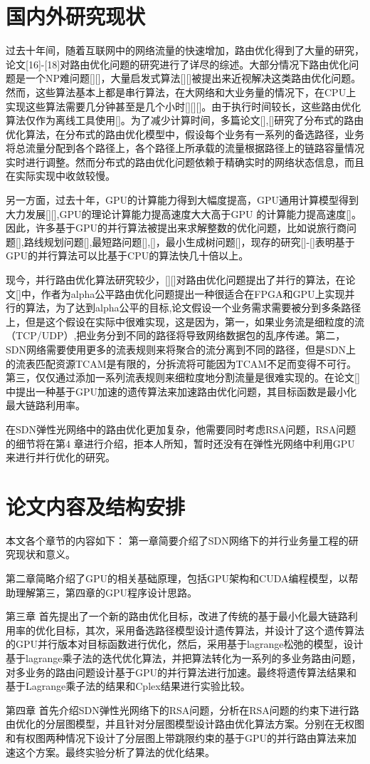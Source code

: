 \documentclass[master]{thesis-uestc}
\begin{document}
\section{国内外研究现状}
过去十年间，随着互联网中的网络流量的快速增加，路由优化得到了大量的研究，论文[16]-[18]对路由优化问题的研究进行了详尽的综述。大部分情况下路由优化问题是一个NP难问题[][]，大量启发式算法[][]被提出来近视解决这类路由优化问题。然而，这些算法基本上都是串行算法，在大网络和大业务量的情况下，在CPU上实现这些算法需要几分钟甚至是几个小时[][][]。由于执行时间较长，这些路由优化算法仅作为离线工具使用[]。为了减少计算时间，多篇论文[],[]研究了分布式的路由优化算法，在分布式的路由优化模型中，假设每个业务有一系列的备选路径，业务将总流量分配到各个路径上，各个路径上所承载的流量根据路径上的链路容量情况实时进行调整。然而分布式的路由优化问题依赖于精确实时的网络状态信息，而且在实际实现中收敛较慢。

另一方面，过去十年，GPU的计算能力得到大幅度提高，GPU通用计算模型得到大力发展[][],GPU的理论计算能力提高速度大大高于GPU 的计算能力提高速度[]。因此，许多基于GPU的并行算法被提出来求解整数的优化问题，比如说旅行商问题[],路线规划问题[],最短路问题[],[]，最小生成树问题[]，现存的研究[]-[]表明基于GPU的并行算法可以比基于CPU的算法快几十倍以上。

 现今，并行路由优化算法研究较少，[][]对路由优化问题提出了并行的算法，在论文[]中，作者为alpha公平路由优化问题提出一种很适合在FPGA和GPU上实现并行的算法，为了达到alpha公平的目标,论文假设一个业务需求需要被分到多条路径上，但是这个假设在实际中很难实现，这是因为，第一，如果业务流是细粒度的流（TCP/UDP）,把业务分到不同的路径将导致网络数据包的乱序传递。第二，SDN网络需要使用更多的流表规则来将聚合的流分离到不同的路径，但是SDN上的流表匹配资源TCAM是有限的，分拆流将可能因为TCAM不足而变得不可行。第三，仅仅通过添加一系列流表规则来细粒度地分割流量是很难实现的。在论文[]中提出一种基于GPU加速的遗传算法来加速路由优化问题，其目标函数是最小化最大链路利用率。

 在SDN弹性光网络中的路由优化更加复杂，他需要同时考虑RSA问题，RSA问题的细节将在第4 章进行介绍，拒本人所知，暂时还没有在弹性光网络中利用GPU来进行并行优化的研究。
\section{论文内容及结构安排}
本文各个章节的内容如下：
    第一章简要介绍了SDN网络下的并行业务量工程的研究现状和意义。

    第二章简略介绍了GPU的相关基础原理，包括GPU架构和CUDA编程模型，以帮助理解第三，第四章的GPU程序设计思路。

    第三章 首先提出了一个新的路由优化目标，改进了传统的基于最小化最大链路利用率的优化目标，其次，采用备选路径模型设计遗传算法，并设计了这个遗传算法的GPU并行版本对目标函数进行优化，然后，采用基于lagrange松弛的模型，设计基于lagrange乘子法的迭代优化算法，并把算法转化为一系列的多业务路由问题，对多业务的路由问题设计基于GPU的并行算法进行加速。最终将遗传算法结果和基于Lagrange乘子法的结果和Cplex结果进行实验比较。

    第四章 首先介绍SDN弹性光网络下的RSA问题，分析在RSA问题的约束下进行路由优化的分层图模型，并且针对分层图模型设计路由优化算法方案。分别在无权图和有权图两种情况下设计了分层图上带跳限约束的基于GPU的并行路由算法来加速这个方案。最终实验分析了算法的优化结果。



\end{document}

